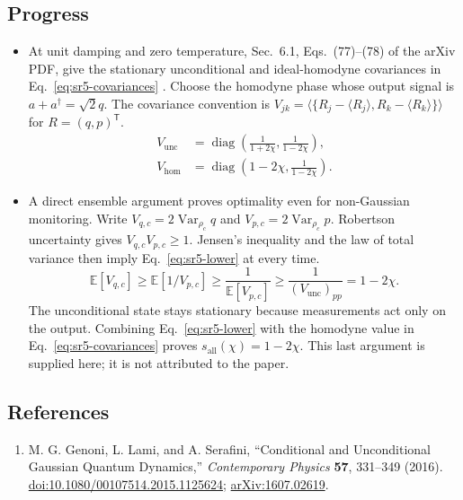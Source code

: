 \subsection*{Progress}

\begin{itemize}
  \item At unit damping and zero temperature, Sec.~6.1, Eqs.~(77)--(78) of the arXiv PDF, give the stationary unconditional and ideal-homodyne covariances in Eq.~\eqref{eq:sr5-covariances} . Choose the homodyne phase whose output signal is $a+a^\dagger=\sqrt2q$. The covariance convention is $V_{jk}=\langle\{R_j-\langle R_j\rangle,R_k-\langle R_k\rangle\}\rangle$ for $R=(q,p)^{\mathsf T}$.
\begin{equation}
\begin{aligned}
 V_{\mathrm{unc}}&=\operatorname{diag}\!\left(\frac1{1+2\chi},\frac1{1-2\chi}\right),\\
 V_{\mathrm{hom}}&=\operatorname{diag}\!\left(1-2\chi,\frac1{1-2\chi}\right).
\end{aligned}
\label{eq:sr5-covariances}
\end{equation}

  \item A direct ensemble argument proves optimality even for non-Gaussian monitoring. Write $V_{q,c}=2\operatorname{Var}_{\rho_c}q$ and $V_{p,c}=2\operatorname{Var}_{\rho_c}p$. Robertson uncertainty gives $V_{q,c}V_{p,c}\geq1$. Jensen's inequality and the law of total variance then imply Eq.~\eqref{eq:sr5-lower} at every time.
\begin{equation}
\mathbb E[V_{q,c}]\geq\mathbb E[1/V_{p,c}]\geq\frac1{\mathbb E[V_{p,c}]}\geq\frac1{(V_{\mathrm{unc}})_{pp}}=1-2\chi.
\label{eq:sr5-lower}
\end{equation}
The unconditional state stays stationary because measurements act only on the output. Combining Eq.~\eqref{eq:sr5-lower} with the homodyne value in Eq.~\eqref{eq:sr5-covariances} proves $s_{\mathrm{all}}(\chi)=1-2\chi$. This last argument is supplied here; it is not attributed to the paper.
\end{itemize}

\subsection*{References}

\begin{enumerate}[label={},leftmargin=4.8em,labelsep=0.5em]
  \footnotesize
  \item[\textup{[GLS16]}]\label{ref:sr5-genoni}
  M. G. Genoni, L. Lami, and A. Serafini, ``Conditional and Unconditional Gaussian Quantum Dynamics,'' \emph{Contemporary Physics} \textbf{57}, 331--349 (2016). \href{https://doi.org/10.1080/00107514.2015.1125624}{doi:10.1080/00107514.2015.1125624}; \href{https://arxiv.org/abs/1607.02619}{arXiv:1607.02619}.
\end{enumerate}

